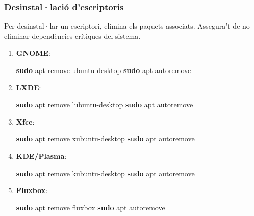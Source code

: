 \documentclass[
  a4paper,
]{article}
\newenvironment{Shaded}{\begin{snugshade}}{\end{snugshade}}
\newcommand{\FunctionTok}[1]{\textcolor[rgb]{0.13,0.29,0.53}{\textbf{#1}}}
\newcommand{\NormalTok}[1]{#1}
\begin{document}
\subsubsection{Desinstal·lació
d'escriptoris}\label{desinstallaciuxf3-descriptoris}

Per desinstal·lar un escriptori, elimina els paquets associats.
Assegura't de no eliminar dependències crítiques del sistema.

\begin{enumerate}
\def\labelenumi{\arabic{enumi}.}
\item
  \textbf{GNOME}:

\begin{Shaded}
\begin{Highlighting}[]
\FunctionTok{sudo}\NormalTok{ apt remove ubuntu{-}desktop}
\FunctionTok{sudo}\NormalTok{ apt autoremove}
\end{Highlighting}
\end{Shaded}
\item
  \textbf{LXDE}:

\begin{Shaded}
\begin{Highlighting}[]
\FunctionTok{sudo}\NormalTok{ apt remove lubuntu{-}desktop}
\FunctionTok{sudo}\NormalTok{ apt autoremove}
\end{Highlighting}
\end{Shaded}
\item
  \textbf{Xfce}:

\begin{Shaded}
\begin{Highlighting}[]
\FunctionTok{sudo}\NormalTok{ apt remove xubuntu{-}desktop}
\FunctionTok{sudo}\NormalTok{ apt autoremove}
\end{Highlighting}
\end{Shaded}
\item
  \textbf{KDE/Plasma}:

\begin{Shaded}
\begin{Highlighting}[]
\FunctionTok{sudo}\NormalTok{ apt remove kubuntu{-}desktop}
\FunctionTok{sudo}\NormalTok{ apt autoremove}
\end{Highlighting}
\end{Shaded}
\item
  \textbf{Fluxbox}:

\begin{Shaded}
\begin{Highlighting}[]
\FunctionTok{sudo}\NormalTok{ apt remove fluxbox}
\FunctionTok{sudo}\NormalTok{ apt autoremove}
\end{Highlighting}
\end{Shaded}
\end{enumerate}
\end{document}
